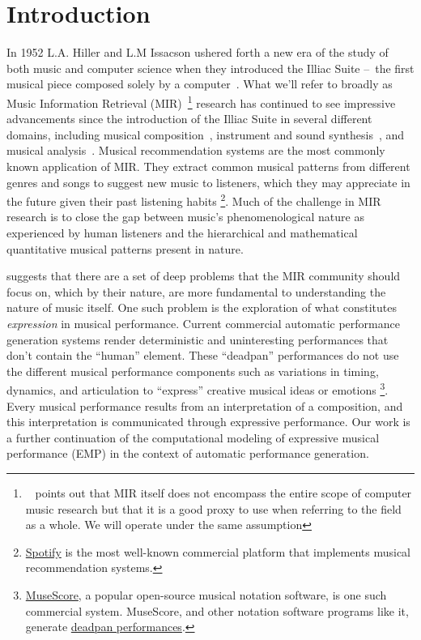 \chapter{Introduction} \label{ch:ch1}

In 1952 L.A. Hiller and L.M Issacson ushered forth a new era of the study of both music and computer science when they introduced the Illiac Suite – the first musical piece composed solely by a computer~\cite{sandred2009revisiting}. What we'll refer to broadly as Music Information Retrieval (MIR)~\footnote{~\citet{widmer2016getting} points out that MIR itself does not encompass the entire scope of computer music research but that it is a good proxy to use when referring to the field as a whole. We will operate under the same assumption} research has continued to see impressive advancements since the introduction of the Illiac Suite in several different domains, including musical composition~\cite{briot2017deep}, instrument and sound synthesis~\cite{engel2017neural}, and musical analysis~\cite{widmer2016getting}. Musical recommendation systems are the most commonly known application of MIR. They extract common musical patterns from different genres and songs to suggest new music to listeners, which they may appreciate in the future given their past listening habits%
\footnote{\href{https://www.spotify.com/us/}{Spotify} is the most well-known commercial platform that implements musical recommendation systems.}. Much of the challenge in MIR research is to close the gap between music's phenomenological nature as experienced by human listeners and the hierarchical and mathematical quantitative musical patterns present in nature.

\citet{widmer2016getting} suggests that there are a set of deep problems that the MIR community should focus on, which by their nature, are more fundamental to understanding the nature of music itself. One such problem is the exploration of what constitutes \emph{expression} in musical performance. Current commercial automatic performance generation systems render deterministic and uninteresting performances that don't contain the ``human'' element. These ``deadpan'' performances do not use the different musical performance components such as variations in timing, dynamics, and articulation to ``express'' creative musical ideas or emotions%
\footnote{\href{https://musescore.org/en}{MuseScore}, a popular open-source musical notation software, is one such commercial system. MuseScore, and other notation software programs like it, generate \href{https://musescore.com/user/33884420/scores/6466906}{deadpan performances}.}. Every musical performance results from an interpretation of a composition, and this interpretation is communicated through expressive performance. Our work is a further continuation of the computational modeling of expressive musical performance (EMP) in the context of automatic performance generation. 

